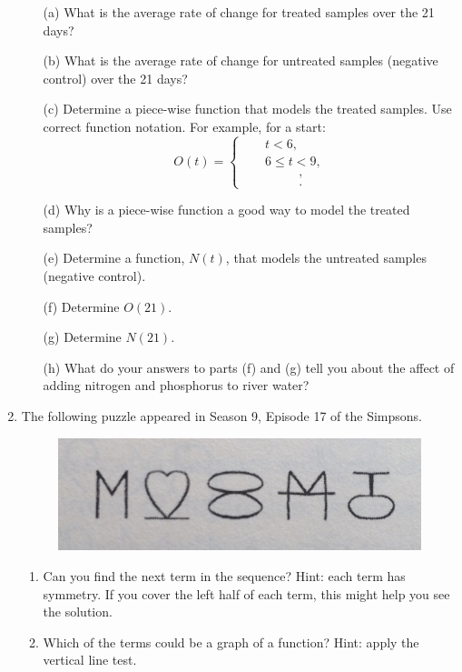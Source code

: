 \documentclass[12pt]{amsart}
\begin{document}
\begin{enumerate}
\begin{itemize}
\item[(a)] What is the average rate of change for treated samples over the 21 days?
\item[(b)] What is the average rate of change for untreated samples (negative control) over the 21 days?
\item[(c)] Determine a piece-wise function that models the treated samples. Use correct function notation. For example, for a start:
$$O(t) = \begin{cases} \ \ \ \  & t<6, \\ \ \ \ \   &6 \leq t < 9, \\ \ \ \ \   & \ \ \ \ \ \ \ \ \ \ \ \  , \\ \ \ \  &  \ \ \ \ \ \ \ \ \ \ \ \ . \end{cases}$$
\item[(d)] Why is a piece-wise function a good way to model the treated samples?
\item[(e)] Determine a function, $N(t)$, that models the untreated samples (negative control). 
\item[(f)] Determine $O(21)$. 
\item[(g)] Determine $N(21)$.
\item[(h)] What do your answers to parts (f) and (g) tell you about the affect of adding nitrogen and phosphorus to river water?
\end{itemize}


\item The following puzzle appeared in Season 9, Episode 17 of the Simpsons.  
\begin{figure}[ht]
\includegraphics[scale=0.05]{simpsons}
\end{figure}

\begin{enumerate}
\item Can you find the next term in the sequence?  Hint: each term has symmetry.  If you cover the left half of each term, this might help you see the solution.
\item Which of the terms could be a graph of a function?  Hint: apply the vertical line test.
\end{enumerate}



\end{enumerate}
\end{document}
